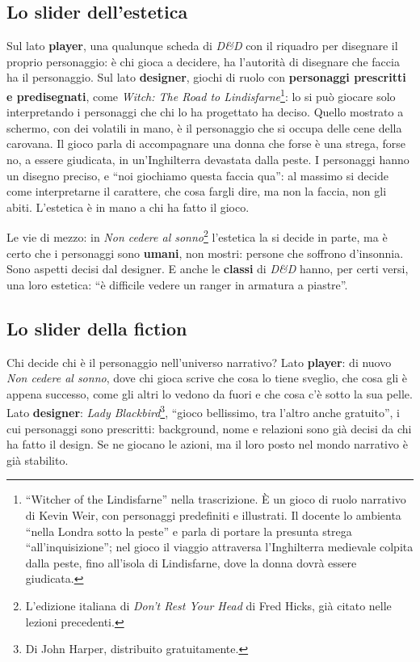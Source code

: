 \subsection{Lo slider dell'estetica}

Sul lato \textbf{player}, una qualunque scheda di \emph{D\&D} con il riquadro per
disegnare il proprio personaggio: è chi gioca a decidere, ha l'autorità di
disegnare che faccia ha il personaggio. Sul lato \textbf{designer}, giochi di ruolo
con \textbf{personaggi prescritti e predisegnati}, come \emph{Witch: The Road to
Lindisfarne}\footnote{``Witcher of the Lindisfarne'' nella trascrizione. È un gioco
di ruolo narrativo di Kevin Weir, con personaggi predefiniti e illustrati. Il
docente lo ambienta ``nella Londra sotto la peste'' e parla di portare la presunta
strega ``all'inquisizione''; nel gioco il viaggio attraversa l'Inghilterra
medievale colpita dalla peste, fino all'isola di Lindisfarne, dove la donna dovrà
essere giudicata.}: lo si può giocare solo interpretando i personaggi che chi lo ha
progettato ha deciso. Quello mostrato a schermo, con dei volatili in mano, è il
personaggio che si occupa delle cene della carovana. Il gioco parla di accompagnare
una donna che forse è una strega, forse no, a essere giudicata, in un'Inghilterra
devastata dalla peste. I personaggi hanno un disegno preciso, e ``noi giochiamo
questa faccia qua'': al massimo si decide come interpretarne il carattere, che cosa
fargli dire, ma non la faccia, non gli abiti. L'estetica è in mano a chi ha fatto il
gioco.

Le vie di mezzo: in \emph{Non cedere al sonno}\footnote{L'edizione italiana di
\emph{Don't Rest Your Head} di Fred Hicks, già citato nelle lezioni precedenti.}
l'estetica la si decide in parte, ma è certo che i personaggi sono \textbf{umani},
non mostri: persone che soffrono d'insonnia. Sono aspetti decisi dal designer. E
anche le \textbf{classi} di \emph{D\&D} hanno, per certi versi, una loro estetica:
``è difficile vedere un ranger in armatura a piastre''.

\subsection{Lo slider della fiction}

Chi decide chi è il personaggio nell'universo narrativo? Lato \textbf{player}: di
nuovo \emph{Non cedere al sonno}, dove chi gioca scrive che cosa lo tiene sveglio,
che cosa gli è appena successo, come gli altri lo vedono da fuori e che cosa c'è
sotto la sua pelle. Lato \textbf{designer}: \emph{Lady Blackbird}\footnote{Di John
Harper, distribuito gratuitamente.}, ``gioco bellissimo, tra l'altro anche
gratuito'', i cui personaggi sono prescritti: background, nome e relazioni sono già
decisi da chi ha fatto il design. Se ne giocano le azioni, ma il loro posto nel
mondo narrativo è già stabilito.

